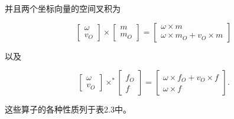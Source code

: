 \documentclass[10pt,a4paper]{book}
\theoremstyle{thmstyle} %
\theoremstyle{defstyle} %
\theoremstyle{prostyle} %
\begin{document}
并且两个坐标向量的空间叉积为



$$
\left[ \begin{array}{l} { \omega } \\{ v _ { O } } \end{array} \right] \times \left[ \begin{array}{l} { m } \\{ m _ { O } } \end{array} \right] = \left[ \begin{array}{l} { \omega \times m } \\{ \omega \times m _ { O } + v _ { O } \times m } \end{array} \right]
$$  



以及



$$
\left[ \begin{array}{l} { \omega } \\{ v _ { O } } \end{array} \right] \times ^{*} \left[ \begin{array}{l} { f _ { O } } \\{ f } \end{array} \right] = \left[ \begin{array}{l} { \omega \times f _ { O } + v _ { O } \times f } \\{ \omega \times f } \end{array} \right] .
$$  



这些算子的各种性质列于表2.3中。
\end{document}

